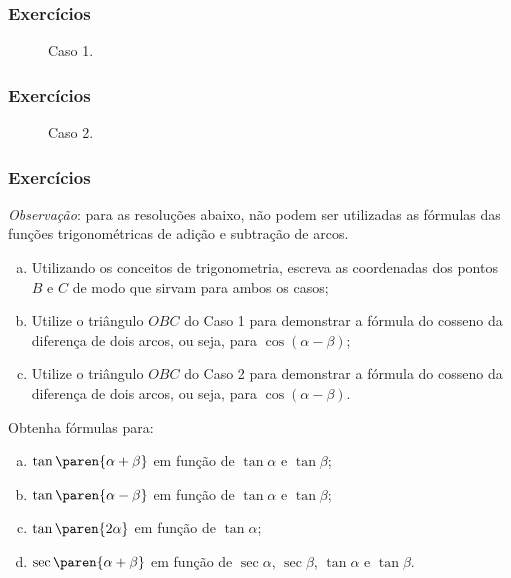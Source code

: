 
\begin{frame}
\frametitle{Exercícios} 
	\begin{figure}[H]
	  \centering
	  \caption{Caso 1.}
	  \label{fig:cos-da-diferenca1}
	\end{figure}

\end{frame}



\begin{frame}
\frametitle{Exercícios} 
  
	\begin{figure}[H]
	  \centering
	  \label{fig:cos-da-diferenca2}
	  \caption{Caso 2.}
	\end{figure}

\end{frame}



\begin{frame}
\frametitle{Exercícios} 
  
	\textit{Observação}: para as resoluções abaixo, não podem ser utilizadas as fórmulas das funções trigonométricas de adição e subtração de arcos.
	\begin{enumerate}[a)]
		\item Utilizando os conceitos de trigonometria, escreva as coordenadas dos pontos $B$ e $C$ de modo que sirvam para ambos os casos;
		\item Utilize o triângulo $OBC$ do Caso 1 para demonstrar a fórmula do cosseno da diferença de dois arcos, ou seja, para $\cos (\alpha - \beta)$;
		\item  Utilize o triângulo $OBC$ do Caso 2 para demonstrar a fórmula do cosseno da diferença de dois arcos, ou seja, para $\cos (\alpha - \beta)$.
  \end{enumerate}
  
  
  \begin{exercise}
	  Obtenha fórmulas para: 
	  \begin{enumerate}[a)]
		\item $\tan\paren{\alpha + \beta}$ em função de $\tan \alpha$ e $\tan \beta$;
		\item $\tan\paren{\alpha - \beta}$ em função de $\tan \alpha$ e $\tan \beta$;
		\item $\tan\paren{2 \alpha}$ em função de $\tan \alpha$;
		\item $\sec \paren{\alpha + \beta}$ em função de $\sec \alpha$, $\sec \beta$, $\tan \alpha$ e $\tan \beta$.
	  \end{enumerate}
  \end{exercise}

\end{frame}


